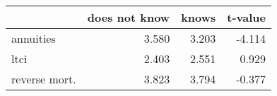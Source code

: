 \begin{tabular}{lrrr}
\toprule
{} &  does not know &  knows &  t-value \\
\midrule
annuities     &          3.580 &  3.203 &   -4.114 \\
ltci          &          2.403 &  2.551 &    0.929 \\
reverse mort. &          3.823 &  3.794 &   -0.377 \\
\bottomrule
\end{tabular}
